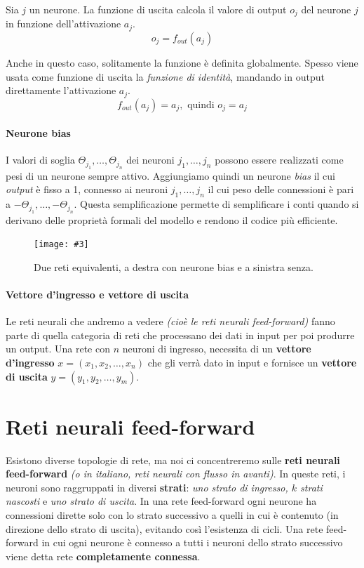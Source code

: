 \documentclass[12pt, twoside, letterpaper]{report}
\newcommand{\img}[4] {
	\begin{figure}
		\centering
		\texttt{[image: \#3]}\\
		\caption{#1}
		\label{#4}
	\end{figure}
}
\begin{document}
			 	Sia $j$ un neurone. La funzione di uscita calcola il valore di output $o_j$ del neurone $j$ in funzione dell'attivazione $a_j$. $$o_j = f_{out}(a_j)$$  
			 	
			 	Anche in questo caso, solitamente la funzione è definita globalmente. Spesso viene usata come funzione di uscita la \textit{funzione di identità}, mandando in output direttamente l'attivazione $a_j$. $$f_{out}(a_j) = a_j, \text{ quindi } o_j = a_j$$
			 	
			 \paragraph{Neurone bias} I valori di soglia $\Theta_{j_1}, \dots, \Theta_{j_n}$ dei neuroni $j_1, \dots, j_n$ possono essere realizzati come pesi di un neurone sempre attivo. Aggiungiamo quindi un neurone \textit{bias} il cui \textit{output} è fisso a 1, connesso ai neuroni $j_1, \dots, j_n$ il cui peso delle connessioni è pari a $-\Theta_{j_1}, \dots, -\Theta_{j_n}$. Questa semplificazione permette di semplificare i conti quando si derivano delle proprietà formali del modello e rendono il codice più efficiente.
			 
			 	\img{Due reti equivalenti, a destra con neurone bias e a sinistra senza. \cite{kriesel}}{0.5}{bias-neuron.png}{bias}
			 	
			 \paragraph{Vettore d'ingresso e vettore di uscita} Le reti neurali che andremo a vedere \textit{(cioè le reti neurali feed-forward)} fanno parte di quella categoria di reti che processano dei dati in input per poi produrre un output. Una rete con $n$ neuroni di ingresso, necessita di un \textbf{vettore d'ingresso} $x = (x_1, x_2, \dots, x_n)$ che gli verrà dato in input e fornisce un \textbf{vettore di uscita} $y = (y_1, y_2, \dots, y_m)$.  
			 	 			 
		\section{Reti neurali feed-forward}
			Esistono diverse topologie di rete, ma noi ci concentreremo sulle \textbf{reti neurali feed-forward} \textit{(o in italiano, reti neurali con flusso in avanti)}. In queste reti, i neuroni sono raggruppati in diversi \textbf{strati}: \textit{uno strato di ingresso, $k$ strati nascosti} e \textit{uno strato di uscita}. In una rete feed-forward ogni neurone ha connessioni dirette solo con lo strato successivo a quelli in cui è contenuto (in direzione dello strato di uscita), evitando così l'esistenza di cicli. Una rete feed-forward in cui ogni neurone è connesso a tutti i neuroni dello strato successivo viene detta rete \textbf{completamente connessa}.
\end{document}
